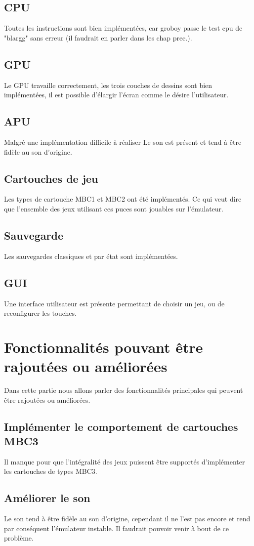 \documentclass{report}
\begin{document}
\subsection*{CPU}
Toutes les instructions sont bien implémentées, car groboy passe le test cpu de "blargg" sans erreur (il faudrait en parler dans les chap prec.). 
\subsection*{GPU}
Le GPU travaille correctement, les trois couches de dessins sont bien implémentées, il est possible d'élargir l'écran comme le désire l'utilisateur.
\subsection*{APU}
Malgré une implémentation difficile à réaliser Le son est présent et tend à être fidèle au son d'origine.
\subsection*{Cartouches de jeu}
Les types de cartouche MBC1 et MBC2 ont été implémentés. Ce qui veut dire que l'ensemble des jeux utilisant ces puces sont jouables sur l'émulateur.
\subsection*{Sauvegarde}
Les sauvegardes classiques et par état sont implémentées.
\subsection*{GUI}
Une interface utilisateur est présente permettant de choisir un jeu, ou de reconfigurer les touches.
\section*{Fonctionnalités pouvant être rajoutées ou améliorées}
Dans cette partie nous allons parler des fonctionnalités principales qui peuvent être rajoutées ou améliorées.
\subsection*{Implémenter le comportement de cartouches MBC3}
Il manque pour que l'intégralité des jeux puissent être supportés d'implémenter les cartouches de types MBC3.
\subsection*{Améliorer le son}
Le son tend à être fidèle au son d'origine, cependant il ne l'est pas encore et rend par conséquent l'émulateur instable. Il faudrait pouvoir venir à bout de ce problème.
\end{document}
